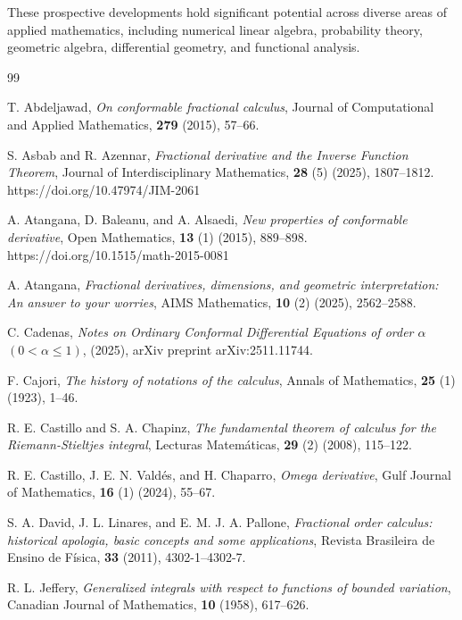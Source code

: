 \documentclass[oneside,10pt]{article}
\theoremstyle{plain}
\theoremstyle{definition}
\begin{document}
These prospective developments hold significant potential across diverse areas of applied mathematics, including numerical linear algebra, probability theory, geometric algebra, differential geometry, and functional analysis.

\begin{thebibliography}{99}

{\sc T. Abdeljawad},
{\it On conformable fractional calculus},
Journal of Computational and Applied Mathematics, {\bf 279} (2015), 57--66.

{\sc S. Asbab and R. Azennar},
{\it Fractional derivative and the Inverse Function Theorem},
Journal of Interdisciplinary Mathematics, {\bf 28} (5) (2025), 1807--1812. https://doi.org/10.47974/JIM-2061

{\sc A. Atangana, D. Baleanu, and A. Alsaedi},
{\it New properties of conformable derivative},
Open Mathematics, {\bf 13} (1) (2015), 889--898. https://doi.org/10.1515/math-2015-0081

{\sc A. Atangana},
{\it Fractional derivatives, dimensions, and geometric interpretation: An answer to your worries},
AIMS Mathematics, {\bf 10} (2) (2025), 2562--2588.

{\sc C. Cadenas},
{\it Notes on Ordinary Conformal Differential Equations of order $\alpha$ $(0<\alpha\leq 1)$}, (2025),
arXiv preprint arXiv:2511.11744.

{\sc F. Cajori},
{\it The history of notations of the calculus},
Annals of Mathematics, {\bf 25} (1) (1923), 1--46.

{\sc R. E. Castillo and S. A. Chapinz},
{\it The fundamental theorem of calculus for the Riemann-Stieltjes integral},
Lecturas Matem\'aticas, {\bf 29} (2) (2008), 115--122.

{\sc R. E. Castillo, J. E. N. Vald\'es, and H. Chaparro},
{\it Omega derivative},
Gulf Journal of Mathematics, {\bf 16} (1) (2024), 55--67.

{\sc S. A. David, J. L. Linares, and E. M. J. A. Pallone},
{\it Fractional order calculus: historical apologia, basic concepts and some applications},
Revista Brasileira de Ensino de F\'isica, {\bf 33} (2011), 4302-1--4302-7.

{\sc R. L. Jeffery},
{\it Generalized integrals with respect to functions of bounded variation},
Canadian Journal of Mathematics, {\bf 10} (1958), 617--626.


\end{thebibliography}
\end{document}
